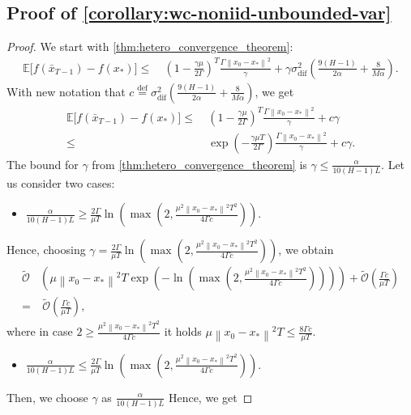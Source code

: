 \documentclass[sn-mathphys,Numbered]{sn-jnl}%
\newcommand*{\E}{{\mathbb E}}
\renewcommand{\|}{\parallel}
\newcommand\br[1]{\left ( #1 \right )}
\newcommand{\sqn}[1]{{\left\lVert#1\right\rVert}^2}
\newcommand{\eqdef}{\overset{\text{def}}{=}}
\newcommand{\sigmaf}{\sigma_{\mathrm{dif}}}
\renewcommand {\*} {\ast}
\begin{document}
\subsection{Proof of \cref{corollary:wc-noniid-unbounded-var}}
\begin{proof}
    We start with \cref{thm:hetero_convergence_theorem}:
    \begin{align*}
        \E\big[f(\bar{x}_{T-1}) - f(x_\ast)\big] \leq&\ \br{1 - \frac{\gamma \mu}{2\Gamma}}^T\frac{\Gamma\sqn{x_{0} - x_\ast}}{\gamma} + \gamma\sigmaf^2\br{\frac{9 (H-1) }{2\alpha}  + \frac{8}{M\alpha}}.
    \end{align*}
    With new notation that $c \eqdef \sigmaf^2\br{\frac{9 (H-1) }{2\alpha}  + \frac{8}{M\alpha}}$, we get
    \begin{align*}
         \E\big[f(\bar{x}_{T-1}) - f(x_\ast)\big] \leq&\ \br{1 - \frac{\gamma \mu}{2\Gamma}}^T\frac{\Gamma\sqn{x_{0} - x_\ast}}{\gamma} + c\gamma \\ \leq&\ \exp{\br{-\frac{\gamma\mu T}{2\Gamma}}}\frac{\Gamma\sqn{x_{0} - x_\ast}}{\gamma} + c\gamma. 
    \end{align*}
    The bound for $\gamma$ from \cref{thm:hetero_convergence_theorem} is $\gamma \leq \frac{\alpha}{10(H-1)L}$. Let us consider two cases:
    \begin{itemize}
        \item $\frac{\alpha}{10(H-1)L} \geq \frac{2\Gamma}{\mu T}\ln{\br{\max{\br{2, \frac{\mu^2 \sqn{x_{0} - x_\ast} T^2}{4\Gamma c}}}}}$.
    \end{itemize}
    Hence, choosing $\gamma = \frac{2\Gamma}{\mu T}\ln{\br{\max{\br{2, \frac{\mu^2 \sqn{x_{0} - x_\ast} T^2}{4\Gamma c}}}}}$, we obtain
    \begin{align*}
        \tilde{\mathcal{O}}&\br{\mu \sqn{x_{0} - x_\ast} T \exp{\br{-\ln{\br{\max{\br{2, \frac{\mu^2 \sqn{x_{0} - x_\ast} T^2}{4\Gamma c}}}}}}}} + \tilde{\mathcal{O}}\br{\frac{\Gamma c}{\mu T}} \\ =&\ \tilde{\mathcal{O}}\br{\frac{\Gamma c}{\mu T}} ,
    \end{align*}
    where in case $2 \geq \frac{\mu^2 \sqn{x_{0} - x_\ast} T^2}{4\Gamma c}$ it holds $\mu \sqn{x_{0} - x_\ast} T \leq \frac{8\Gamma c}{\mu T}$.
    \begin{itemize}
        \item $\frac{\alpha}{10(H-1)L} \leq \frac{2\Gamma}{\mu T}\ln{\br{\max{\br{2, \frac{\mu^2 \sqn{x_{0} - x_\ast} T^2}{4\Gamma c}}}}}$.
    \end{itemize}
    Then, we choose $\gamma$ as $\frac{\alpha}{10(H-1)L}$ Hence, we get

\end{proof}
\end{document}
